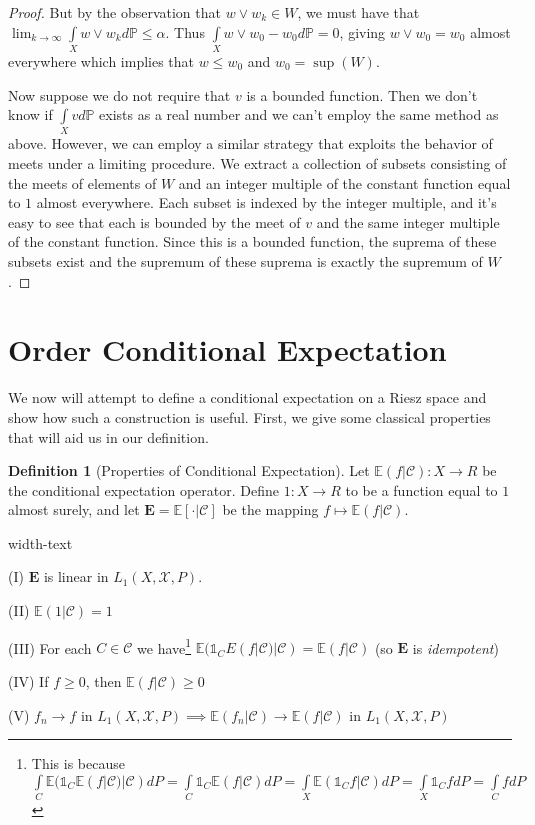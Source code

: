 \documentclass[letterpaper,10pt,oneside,onecolumn,reqno]{amsart}
\newcommand{\C}{\mathcal C}
\newcommand{\E}{\mathbb E}
\renewcommand{\P}{\mathbb P}
\newcommand{\X}{\mathcal X}
\newcommand{\one}{\mathds{1}}      %
\theoremstyle{definition}
\newtheorem{defn}{Definition}
\newcommand{\join}{\vee}
\begin{document}
\begin{proof}
But by the observation that $w \join w_k \in W$, we must have that
$\lim_{k \to \infty}\int\limits_X w \join w_k d\P \leq \alpha$. Thus
$\int\limits_X w \join w_0 - w_0 d\P = 0$, giving $w \join w_0 = w_0$
almost everywhere which implies that $w \leq w_0$ and $w_0 = \sup(W)$.

Now suppose we do not require that $v$ is a bounded function. Then we
don't know if $\int\limits_X v d\P$ exists as a real number and we
can't employ the same method as above. However, we can employ a
similar strategy that exploits the behavior of meets under a limiting
procedure. We extract a collection of subsets consisting of the meets
of elements of $W$ and an integer multiple of the constant function
equal to $1$ almost everywhere. Each subset is indexed by the integer
multiple, and it's easy to see that each is bounded by the meet of $v$
and the same integer multiple of the constant function. Since this is
a bounded function, the suprema of these subsets exist and the
supremum of these suprema is exactly the supremum of $W$. 
\end{proof}


\part{Order Conditional Expectation}

We now will attempt to define a conditional expectation on a Riesz
space and show how such a construction is useful. First, we give some
classical properties that will aid us in our definition.

\begin{defn}[Properties of Conditional Expectation]\label{def:14}
  Let $\E(f|\C) : X \to R$ be the conditional expectation
  operator. Define $1 : X \to R$ to be a function equal to $1$ almost
  surely, and let $\mathbf{E}=\E[\cdot|\C]$ be the mapping $f \mapsto
  \E(f|\C)$.
  \begin{deflist}{width-text}
  \item[(I)] $\mathbf{E}$ is linear in $L_1(X,\X,P)$.
  \item[(II)] $\E(1|\C) = 1$
  \item[(III)] For each $C \in \C$ we have\footnote{This is because
      $\int\limits_C\E(\one_C \E(f|\C)|\C)dP=\int\limits_C \one_C
      \E(f|\C)dP=\int\limits_X \E(\one_C f | \C)dP=\int\limits_X
      \one_C fdP=\int\limits_C fdP$ \label{fn:1}} $\E(\one_C
    E(f|\C)|\C) = \E(f|\C)$ (so $\mathbf{E}$ is \emph{idempotent})
  \item[(IV)] If $f \geq 0$, then $\E(f|\C) \geq 0$
  \item[(V)] $f_n \rightarrow f$ in $L_1(X,\X,P) \implies \E(f_n|\C)
    \rightarrow \E(f|\C)$ in $L_1(X,\X,P)$
  \end{deflist}
\end{defn}
\end{document}
